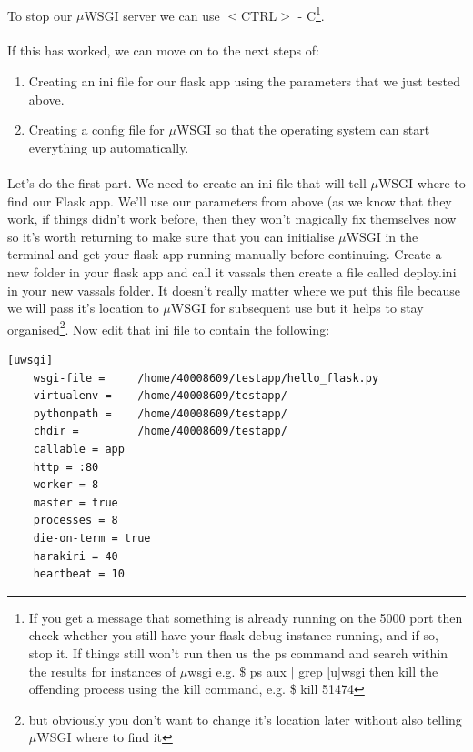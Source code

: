 \documentclass[12pt, a4paper, oneside]{book}
\begin{document}
{\paragraph{} To stop our $\mu$WSGI server we can use $<$CTRL$>$ - C\footnote{If you get a message that something is already running on the 5000 port then check whether you still have your flask debug instance running, and if so, stop it. If things still won't run then us the ps command and search within the results for instances of $\mu$wsgi e.g. \$ ps aux $|$ grep [u]wsgi then kill the offending process using the kill command, e.g. \$ kill 51474}.

\paragraph{} If this has worked, we can move on to the next steps of:

\begin{enumerate}
\item Creating an ini file for our flask app using the parameters that we just tested above.
\item Creating a config file for $\mu$WSGI so that the operating system can start everything up automatically.
\end{enumerate}

\paragraph{} Let's do the first part. We need to create an ini file that will tell $\mu$WSGI where to find our Flask app. We'll use our parameters from above (as we know that they work, if things didn't work before, then they won't magically fix themselves now so it's worth returning to make sure that you can initialise $\mu$WSGI in the terminal and get your flask app running manually before continuing. Create a new folder in your flask app and call it vassals then create a file called deploy.ini in your new vassals folder. It doesn't really matter where we put this file because we will pass it's location to $\mu$WSGI for subsequent use but it helps to stay organised\footnote{but obviously you don't want to change it's location later without also telling $\mu$WSGI where to find it}. Now edit that ini file to contain the following:

\begin{lstlisting}
[uwsgi]
	wsgi-file = 	/home/40008609/testapp/hello_flask.py
	virtualenv = 	/home/40008609/testapp/
	pythonpath = 	/home/40008609/testapp/
	chdir = 	    /home/40008609/testapp/
  	callable = app
	http = :80
	worker = 8
	master = true
	processes = 8
	die-on-term = true
	harakiri = 40
	heartbeat = 10
\end{lstlisting}

}
\end{document}
